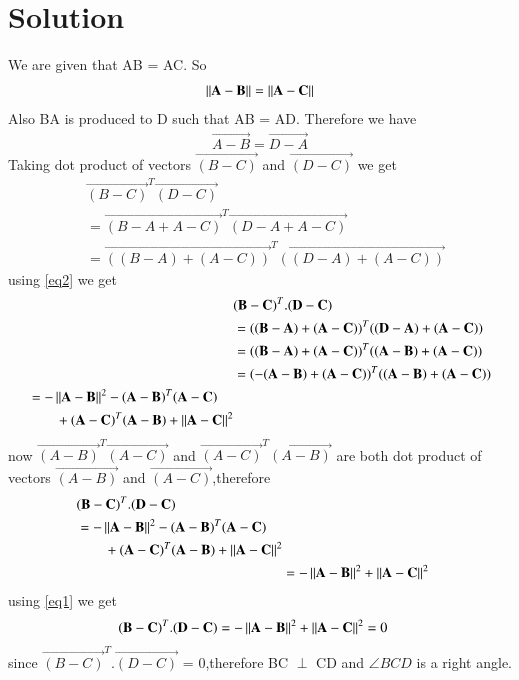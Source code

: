 \documentclass[journal,12pt,twocolumn]{IEEEtran}
\begin{document}
\section{\textbf{Solution}}
\renewcommand{\thefigure}{\arabic{figure}}
\begin{figure}[!h]
  \centering
  \caption{}
  \label{myfig}
\end{figure}
We are given that AB = AC. So
\begin{align}
  \left\lVert\mathbf{A-B}\right\rVert = \left\lVert\mathbf{A-C}\right\rVert \label{eq1}
\end{align}
Also BA is produced to D such that AB = AD. Therefore we have
\begin{align}
  \vec{A-B} = \vec{D-A} \label{eq2}
\end{align}
Taking dot product of vectors $\vec{(B-C)}$ and $\vec{(D-C)}$ we get
\begin{align*}
  &\vec{(B-C)}^T\vec{(D-C)}\\
  &= \vec{(B-A+A-C)}^T\vec{(D-A+A-C)}\\
  &= \vec{((B-A)+(A-C))}^T\vec{((D-A)+(A-C))}
\end{align*}
using \eqref{eq2} we get
\begin{align*}
  &\mathbf{(B-C)}^T.\mathbf{(D-C)} \\
  &= \mathbf{((B-A)+(A-C))}^T\mathbf{((D-A)+(A-C))}\\
  &= \mathbf{((B-A)+(A-C))}^T\mathbf{((A-B)+(A-C))}\\
  &= \mathbf{(-(A-B)+(A-C))}^T\mathbf{((A-B)+(A-C))}\\
  \begin{split}
    &= -\left\lVert\mathbf{A-B}\right\rVert^2-\mathbf{(A-B)}^T\mathbf{(A-C)}\\
    &\qquad +\mathbf{(A-C)}^T\mathbf{(A-B)}+\left\lVert\mathbf{A-C}\right\rVert^2
  \end{split}
\end{align*}
now $\vec{(A-B)}^T\vec{(A-C)}$ and $\vec{(A-C)}^T\vec{(A-B)}$ are both dot product of vectors $\vec{(A-B)}$ and $\vec{(A-C)}$,therefore
\begin{align*}
  \begin{split}
    &\mathbf{(B-C)}^T.\mathbf{(D-C)} \\
    &= -\left\lVert\mathbf{A-B}\right\rVert^2-\mathbf{(A-B)}^T\mathbf{(A-C)}\\
                                &\qquad +\mathbf{(A-C)}^T\mathbf{(A-B)}+\left\lVert\mathbf{A-C}\right\rVert^2
  \end{split}\\
  &= -\left\lVert\mathbf{A-B}\right\rVert^2+\left\lVert\mathbf{A-C}\right\rVert^2
\end{align*}
using \eqref{eq1} we get
\begin{align}
  \mathbf{(B-C)}^T.\mathbf{(D-C)} &= -\left\lVert\mathbf{A-B}\right\rVert^2+\left\lVert\mathbf{A-C}\right\rVert^2 = 0
\end{align}
since $\vec{(B-C)}^T.\vec{(D-C)}$ = 0,therefore BC $\perp$ CD and $\angle{BCD}$ is a right angle.
\end{document}
